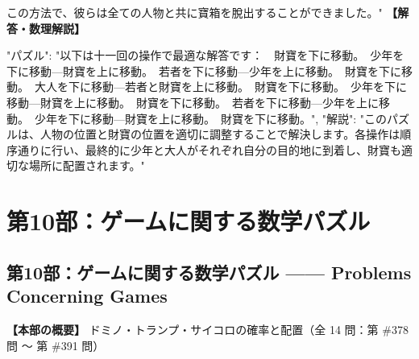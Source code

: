 \documentclass[10pt,a4paper,oneside,openany]{ltjsbook}
\begin{document}
\begin{tcolorbox}[colback=softblue,colframe=primaryblue,title=\textbf{第 377 問：STEALING THE CASTLE TREASURE.},arc=2mm,boxrule=1pt,breakable]
{この方法で、彼らは全ての人物と共に寶箱を脫出することができました。"
}
\tcblower
\textbf{【解答・数理解説】}\par\vspace{0.3em}
{
  "パズル": "以下は十一回の操作で最適な解答です：\
\
財寶を下に移動。\
少年を下に移動—財寶を上に移動。\
若者を下に移動—少年を上に移動。\
財寶を下に移動。\
大人を下に移動—若者と財寶を上に移動。\
財寶を下に移動。\
少年を下に移動—財寶を上に移動。\
財寶を下に移動。\
若者を下に移動—少年を上に移動。\
少年を下に移動—財寶を上に移動。\
財寶を下に移動。",
  "解説": "このパズルは、人物の位置と財寶の位置を適切に調整することで解決します。各操作は順序通りに行い、最終的に少年と大人がそれぞれ自分の目的地に到着し、財寶も適切な場所に配置されます。"
}
\end{tcolorbox}

\part{第10部：ゲームに関する数学パズル}
\chapter*{第10部：ゲームに関する数学パズル —— Problems Concerning Games}

\textbf{【本部の概要】} ドミノ・トランプ・サイコロの確率と配置（全 14 問：第 \#378 問 〜 第 \#391 問）

\vspace{1em}
\end{document}
